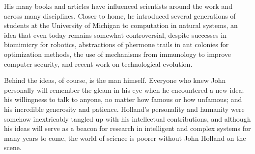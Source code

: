 \documentclass{sig-alternate}
\begin{document}
His many books and articles have influenced 
scientists around the work and across many disciplines.  Closer to home, he introduced several
generations of students at the University of Michigan to 
computation in natural systems, an idea that even today
remains somewhat controversial, despite successes in biomimicry
for robotics, abstractions of phermone trails in ant colonies for
optimization methods, the use of mechanisms from immunology to
improve computer security, and recent work on technological
evolution.  

Behind the ideas, of course, is the man himself.   Everyone who knew
John personally will remember the gleam in his eye when he
encountered a new idea; his willingness to talk to anyone, no matter
how famous or how unfamous; and his incredible generosity and patience.
Holland's personality and humanity were somehow inextricably tangled
up with his intellectual contributions, and although his ideas will serve as a beacon
for research in intelligent and complex systems
for many years to come, the world of science is poorer without John
Holland on the scene.






\end{document}
